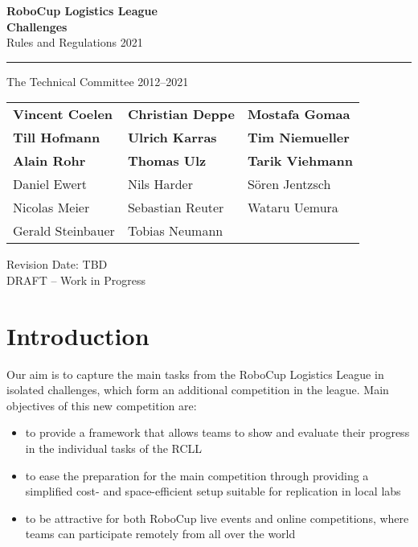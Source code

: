 \documentclass[12pt,twoside]{article}
\begin{document}
\begin{titlepage}
  \vspace*{5cm}
  \begin{center}
    \begin{LARGE}

      {\bf RoboCup Logistics League}\\[2ex]
			{\Large \bf{Challenges}}\\[4ex]
      {\Large Rules and Regulations 2021}\\[4ex]
    \end{LARGE}
    \hrule

    {\LARGE\vspace*{4ex}}
    \begin{Large}
      The Technical Committee 2012--2021\\[6ex]
    \end{Large}
    \begin{tabular}{lll}
      \textbf{Vincent Coelen}&\textbf{Christian Deppe}&\textbf{Mostafa Gomaa}\\
      \textbf{Till Hofmann}&\textbf{Ulrich Karras}&\textbf{Tim Niemueller}\\
			\textbf{Alain Rohr}&\textbf{Thomas Ulz}&\textbf{Tarik Viehmann}\\[.5em]

      Daniel Ewert&Nils Harder&S\"oren Jentzsch\\
      Nicolas Meier&Sebastian Reuter&Wataru Uemura\\
      Gerald Steinbauer&Tobias Neumann\\
    \end{tabular}
    \vfill
    Revision Date: TBD\\
		DRAFT -- Work in Progress
  \end{center}
\end{titlepage}


\section{Introduction}
\label{sec:intro}
Our aim is to capture the main tasks from the RoboCup Logistics League in
isolated challenges, which form an additional competition in the league.
Main objectives of this new competition are:
\begin{itemize}
	\item to provide a framework that allows teams to show and evaluate their
		progress in the individual tasks of the RCLL
	\item to ease the preparation for the main competition through providing a
		simplified cost- and space-efficient setup suitable for replication in
		local labs
	\item to be attractive for both RoboCup live events and online competitions,
		where teams can participate remotely from all over the world
\end{itemize}
\end{document}

